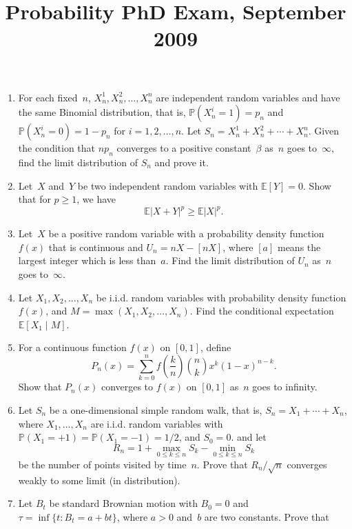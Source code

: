 \documentclass[11pt,letterpaper]{article}
\title{Probability PhD Exam, September 2009}
\author{}
\date{}
\newenvironment{examproblems}[2]{%
  \def\ProblemHeadingTag{#2}%
  \AssignTaggingSocketPlug{block/list/label}{examproblem}%
  \begin{enumerate}%
  \setcounter{enumi}{#1}%
  \renewcommand{\labelenumi}{\textbf{\theenumi.}}%
  \setlength{\topsep}{0.35em}%
  \setlength{\partopsep}{0pt}%
  \setlength{\itemsep}{0.48em}%
  \setlength{\parsep}{0.18em}%
}{\end{enumerate}}
\begin{document}
\maketitle
\thispagestyle{empty}
\begin{examproblems}{0}{H2}
\def\ProblemHeadingText{Problem 1.}
\item
For each fixed~\(n\), \(X_n^1, X_n^2, \ldots, X_n^n\) are independent random variables and have the same Binomial distribution, that is, \(\mathbb P(X_n^i=1)=p_n\) and \(\mathbb P(X_n^i=0)=1-p_n\) for \(i=1,2,\ldots,n\). Let \(S_n=X_n^1+X_n^2+\cdots+X_n^n\). Given the condition that \(np_n\) converges to a positive constant~\(\beta\) as~\(n\) goes to~\(\infty\), find the limit distribution of \(S_n\) and prove it.
\def\ProblemHeadingText{Problem 2.}
\item
Let~\(X\) and~\(Y\) be two independent random variables with \(\mathbb E[Y]=0\). Show that for \(p\geq 1\), we have
\[
\mathbb E|X+Y|^p\geq \mathbb E|X|^p.
\]
\def\ProblemHeadingText{Problem 3.}
\item
Let~\(X\) be a positive random variable with a probability density function \(f(x)\) that is continuous and \(U_n=nX-[nX]\), where \([a]\) means the largest integer which is less than~\(a\). Find the limit distribution of \(U_n\) as~\(n\) goes to~\(\infty\).
\def\ProblemHeadingText{Problem 4.}
\item
Let \(X_1,X_2,\ldots,X_n\) be i.i.d. random variables with probability density function \(f(x)\), and \(M=\max(X_1,X_2,\ldots,X_n)\). Find the conditional expectation \(\mathbb E[X_1\mid M]\).
\def\ProblemHeadingText{Problem 5.}
\item
For a continuous function \(f(x)\) on \([0,1]\), define
\[
P_n(x)=\sum_{k=0}^n f\left(\frac{k}{n}\right)\binom{n}{k}x^k(1-x)^{n-k}.
\]
 Show that \(P_n(x)\) converges to \(f(x)\) on \([0,1]\) as~\(n\) goes to infinity.
\def\ProblemHeadingText{Problem 6.}
\item
Let \(S_n\) be a one-dimensional simple random walk, that is, \(S_n=X_1+\cdots+X_n\), where \(X_1,\ldots,X_n\) are i.i.d. random variables with \(\mathbb P(X_1=+1)=\mathbb P(X_1=-1)=1/2\), and \(S_0=0\). and let
\[
R_n=1+\max_{0\leq k\leq n}S_k-\min_{0\leq k\leq n}S_k
\]
 be the number of points visited by time~\(n\). Prove that \(R_n/\sqrt n\) converges weakly to some limit (in distribution).
\def\ProblemHeadingText{Problem 7.}
\item
Let \(B_t\) be standard Brownian motion with \(B_0=0\) and \(\tau=\inf\{t:B_t=a+bt\}\), where \(a>0\) and~\(b\) are two constants. Prove that

\end{examproblems}
\end{document}
